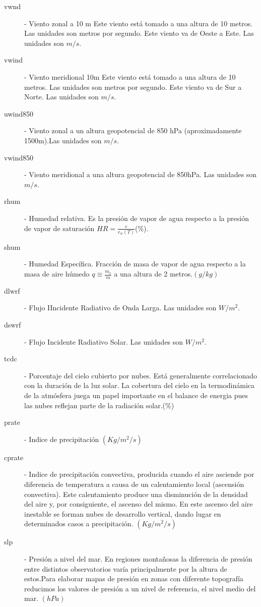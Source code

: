 \documentclass[12pt]{article}
\begin{document}
\begin{description}
\item[vwnd ] - Viento zonal a 10 m Este viento está tomado a una altura de 10 metros. Las unidades son metros por segundo. Este viento va de Oeste a Este. Las unidades son $m/s$.
\item[vwind ] - Viento meridional 10m Este viento está tomado a una altura de 10 metros. Las unidades son metros por segundo. Este viento va de Sur a Norte. Las unidades son $m/s$.
\item[uwind850 ] - Viento zonal a un altura geopotencial de 850 hPa (aproximadamente 1500m).Las unidades son $m/s$.
\item[vwind850 ] - Viento meridional a una altura  geopotencial de 850hPa. Las unidades son $m/s$.
\item[rhum] - Humedad relativa. Es la presión de vapor de agua  respecto a la presión de vapor de saturación $HR=\frac{e}{e_w(T)}$(\%).
\item[shum] - Humedad Específica. Fracción de masa de vapor de agua respecto a la masa de aire húmedo $q \equiv \frac{m_v}{m}$ a una altura de 2 metros.$(g/kg)$
\item[dlwrf] -  Flujo IIncidente Radiativo de Onda Larga. Las unidades son $W/m^2$.
\item[dswrf] -  Flujo Incidente Radiativo Solar. Las unidades son $W/m^2$.
\item[tcdc] - Porcentaje del cielo cubierto por nubes. Está generalmente correlacionado con la duración de la luz solar. La cobertura del cielo en la termodinámica de la atmósfera juega un papel  importante en el balance de energia pues las nubes reflejan parte de la radiación solar.(\%)
\item[prate] -  Indice de precipitación $(Kg/m^2 /s)$
\item[cprate] -  Indice de precipitación convectiva, producida cuando el aire asciende por diferencia de temperatura a causa de un calentamiento local (ascensión convectiva). Este calentamiento produce una disminución de la densidad del aire y, por consiguiente, el ascenso del mismo. En este ascenso del aire inestable se forman nubes de desarrollo vertical, dando lugar en determinados casos a precipitación. $(Kg/m^2 /s)$
\item[slp] -  Presión a nivel del mar. En regiones montañosas la diferencia de presión entre distintos observatorios varía principalmente por la altura de estos.Para elaborar mapas de presión en zonas con diferente topografía reducimos los valores de presión a un nivel de referencia, el nivel medio del mar.  $(hPa)$

\end{description}
\end{document}
